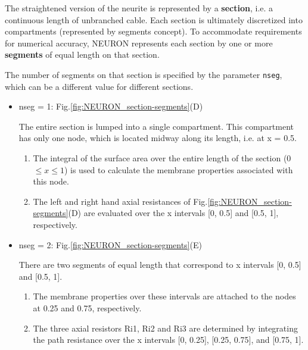 The straightened version of the neurite is represented by a
{\bf section}, i.e. a continuous length of unbranched cable.
Each section is ultimately discretized into compartments (represented by
segments concept). To accommodate requirements for numerical accuracy, NEURON
represents each section by one or more {\bf segments} of equal length on that section.

The number of segments on that section is specified by the parameter
\verb!nseg!, which can be a different value for different sections.
\begin{itemize}
  \item nseg = 1: Fig.\ref{fig:NEURON_section-segments}(D)
  
The entire section is lumped into a single compartment.
This compartment has only one node, which is located midway along its length,
i.e. at x = 0.5.
\begin{enumerate}
  \item The integral of the surface area over the entire length of the section (0 
  $\le x \le 1$) is used to calculate the membrane properties associated with
  this node.

  \item The left and right hand axial resistances of
  Fig.\ref{fig:NEURON_section-segments}(D) are evaluated over the x intervals
  [0, 0.5] and [0.5, 1], respectively.
\end{enumerate}
  
  \item nseg = 2: Fig.\ref{fig:NEURON_section-segments}(E)
  
There are two segments of equal length that correspond to x intervals [0, 0.5]
and [0.5, 1].
\begin{enumerate}
  \item  The membrane properties over these
intervals are attached to the nodes at 0.25 and 0.75, respectively.
  
  \item The three axial resistors Ri1, Ri2 and Ri3
are determined by integrating the path resistance over the x intervals [0,
0.25], [0.25, 0.75], and [0.75, 1].
\end{enumerate}
  
\end{itemize}

